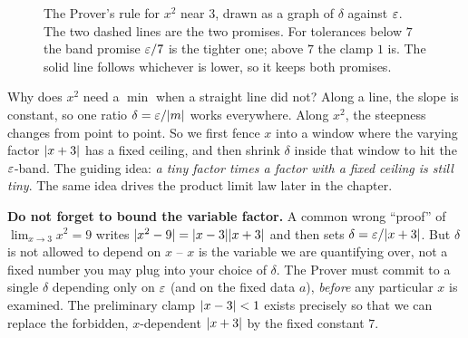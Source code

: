 \begin{figure}[htbp]
\centering
{}
\caption{The Prover's rule for $x^2$ near $3$, drawn as a graph of $\delta$
against $\varepsilon$. The two dashed lines are the two promises. For tolerances below
$7$ the band promise $\varepsilon/7$ is the tighter one; above $7$ the clamp $1$ is.
The solid line follows whichever is lower, so it keeps both promises.}
\label{ch06:fig-delta-rule}
\end{figure}

\begin{whybox}
Why does $x^2$ need a $\min$ when a straight line did not? Along a line,
the slope is constant, so one ratio $\delta = \varepsilon/\lvert m\rvert$ works everywhere.
Along $x^2$, the steepness changes from point to point. So we first fence $x$ into a window
where the varying factor $\lvert x+3\rvert$ has a fixed ceiling, and then shrink $\delta$ inside that window to
hit the $\varepsilon$-band. The guiding idea:
\emph{a tiny factor times a factor with a fixed ceiling is still tiny}.
The same idea drives the product limit law later in the chapter.
\end{whybox}

\begin{trapbox}
\textbf{Do not forget to bound the variable factor.} A common wrong ``proof'' of
$\lim_{x\to3}x^2=9$ writes $\lvert x^2-9\rvert=\lvert x-3\rvert\lvert x+3\rvert$ and then sets
$\delta=\varepsilon/\lvert x+3\rvert$. But $\delta$ is not allowed to depend on $x$ -- $x$ is
the variable we are quantifying over, not a fixed number you may plug into your
choice of $\delta$. The Prover must commit to a single $\delta$ depending only on
$\varepsilon$ (and on the fixed data $a$), \emph{before} any particular $x$ is examined.
The preliminary clamp $\lvert x-3\rvert<1$ exists precisely so that we can replace the
forbidden, $x$-dependent $\lvert x+3\rvert$ by the fixed constant $7$.
\end{trapbox}

